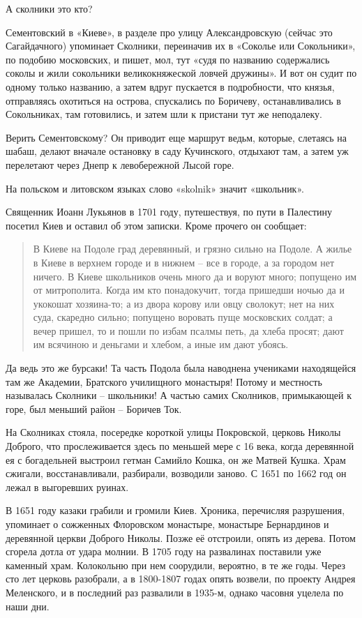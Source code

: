 А сколники это кто?

Сементовский в «Киеве»\cite{sement01}, в разделе про улицу Александровскую (сейчас это Сагайдачного) упоминает Сколники, переиначив их в «Соколье или Сокольники», по подобию московских, и пишет, мол, тут «судя по названию содержались соколы и жили сокольники великокняжеской ловчей дружины». И вот он судит по одному только названию, а затем вдруг пускается в подробности, что князья, отправляясь охотиться на острова, спускались по Боричеву, останавливались в Сокольниках, там готовились, и затем шли к пристани тут же неподалеку.

Верить Сементовскому? Он приводит еще маршрут ведьм, которые, слетаясь на шабаш, делают вначале остановку в саду Кучинского, отдыхают там, а затем уж перелетают через Днепр к левобережной Лысой горе.

На польском и литовском языках слово «skolnik» значит «школьник».

Священник Иоанн Лукьянов в 1701 году, путешествуя, по пути в Палестину посетил Киев и оставил об этом записки\cite{sbornikmat}. Кроме прочего он сообщает:

\begin{quotation}
В Киеве на Подоле град деревянный, и грязно сильно на Подоле. А жилье в Киеве в верхнем городе и в нижнем – все в городе, а за городом нет ничего. В Киеве школьников очень много да и воруют много; попущено им от митрополита. Когда им кто понадокучит, тогда пришедши ночью да и укокошат хозяина-то; а из двора корову или овцу сволокут; нет на них суда, скаредно сильно; попущено воровать пуще московских солдат; а вечер пришел, то и пошли по избам псалмы петь, да хлеба просят; дают им всячиною и деньгами и хлебом, а иные им дают убоясь.
\end{quotation}

Да ведь это же бурсаки! Та часть Подола была наводнена учениками находящейся там же Академии, Братского училищного монастыря! Потому и местность называлась Сколники – школьники! А частью самих Сколников, примыкающей к горе, был меньший район – Боричев Ток.

На Сколниках стояла, посередке короткой улицы Покровской, церковь Николы Доброго, что прослеживается здесь по меньшей мере с 16 века, когда деревянной ея с богадельней выстроил гетман Самийло Кошка, он же Матвей Кушка. Храм сжигали, восстанавливали, разбирали, возводили заново. С 1651 по 1662 год он лежал в выгоревших руинах.

В 1651 году казаки грабили и громили Киев. Хроника, перечисляя разрушения, упоминает о сожженных Флоровском монастыре, монастыре Бернардинов и деревянной церкви Доброго Николы. Позже её отстроили, опять из дерева. Потом сгорела дотла от удара молнии. В 1705 году на развалинах поставили уже каменный храм. Колокольню при нем соорудили, вероятно, в те же годы. Через сто лет церковь разобрали, а в 1800-1807 годах опять возвели, по проекту Андрея Меленского, и в последний раз развалили в 1935-м, однако часовня уцелела по наши дни.

